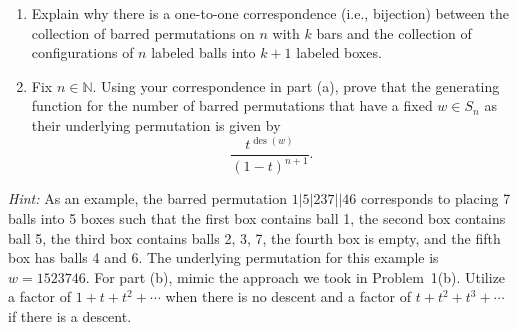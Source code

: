 \documentclass[11pt]{article}%
\theoremstyle{definition}
\DeclareMathOperator{\des}{des}
\begin{document}
\begin{enumerate}
\begin{enumerate}
\item Explain why there is a one-to-one correspondence (i.e., bijection) between the collection of barred permutations on $n$ with $k$ bars and the collection of configurations of $n$ labeled balls into $k+1$ labeled boxes.
\item Fix $n\in \mathbb{N}$. Using your correspondence in part (a), prove that the generating function for the number of barred permutations that have a fixed $w\in S_n$ as their underlying permutation is given by
\[
\frac{t^{\des(w)}}{(1-t)^{n+1}}.
\]
\end{enumerate}
\emph{Hint:} As an example, the barred permutation  $1|5|237||46$ corresponds to placing 7 balls into 5 boxes such that the first box contains ball 1, the second box contains ball 5, the third box contains balls 2, 3, 7, the fourth box is empty, and the fifth box has balls 4 and 6. The underlying permutation for this example is $w=1523746$. For part (b), mimic the approach we took in Problem~1(b).  Utilize a factor of $1+t+t^2+\cdots$ when there is no descent and a factor of $t+t^2+t^3+\cdots$ if there is a descent.
\end{enumerate}
\end{document}
